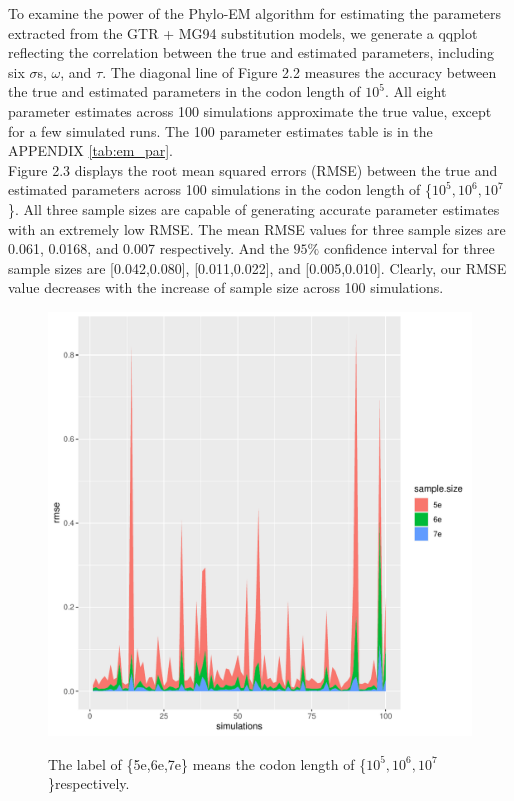 To examine the power of the Phylo-EM algorithm for estimating the parameters extracted from the GTR + MG94 substitution models, we generate a qqplot reflecting the correlation between the true and estimated parameters, including six $\sigma$s, $\omega$, and $\tau$. The diagonal line of Figure 2.2 measures the accuracy between the true and estimated parameters in the codon length of $10^5$. All eight parameter estimates across 100 simulations approximate the true value, except for a few simulated runs. The 100 parameter estimates table is in the APPENDIX \ref{tab:em_par}. \\  
\indent Figure 2.3 displays the root mean squared errors (RMSE) between the true and estimated parameters across 100 simulations in the codon length of \{$10^{5}, 10^{6}, 10^{7}$\}. All three sample sizes are capable of generating accurate parameter estimates with an extremely low RMSE. The mean RMSE values for three sample sizes are 0.061, 0.0168, and 0.007 respectively. And the $95\%$ confidence interval for three sample sizes are [0.042,0.080], [0.011,0.022], and [0.005,0.010]. Clearly, our RMSE value decreases with the increase of sample size across 100 simulations. 
\begin{figure}[H]
     \begin{minipage}[t]{1\textwidth }
     \centering
     \includegraphics[width=\linewidth]{Fig3.pdf}
      {The label of {\{5e,6e,7e\} means the codon length of \{$10^{5}, 10^{6}, 10^{7}$\}respectively}.
      \par}
     \end{minipage}
\end{figure}


